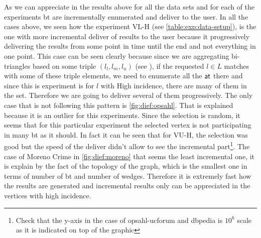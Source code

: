 As we can appreciate in the results above for all the data sets and for each of the experiments \acrshort{bt} are incrementally 
enumerated and deliver to the user. In all the cases above, we seen how the experiment VL-H (see \autoref{table:exp:data-setup}), 
is the one with more incremental deliver of results to the user because it progressively delivering the results from some point in 
time until the end and not everything in one point. This case can be seen clearly because since we are aggregating bi-triangles based on 
some triple $(l_l,l_m,l_u)$ (see ), if the requested $l \in L$ matches with some of these triple elements, 
we need to enumerate all the $\mathsf{at}$ there and since this is experiment is for $l$ with High incidence, there are many of them in the set.
Therefore we are going to deliver several of them progressively.
The only case that is not following this pattern is \autoref{fig:dief:opsahl}. That is explained because it is an outlier for this experiments.
Since the selection is random, it seems that for this particular experiment the selected vertex is not participating in many \acrshort{bt} as it should.
In fact it can be seen that for VU-H, the selection was good but the speed of the deliver didn't allow to see the incremental part\footnote{Check that the y-axis in the case of opsahl-ucforum and \acrshort{dbpedia} is $10^6$ scale as it is indicated on top of the graphic}. 
The case of Moreno Crime in \autoref{fig:dief:moreno} that seems the least incremental one, it is explain by the fact of the topology of the graph, which is the smallest one 
in terms of number of \acrshort{bt} and number of wedges. Therefore it is extremely fast how the results are generated and incremental results only can be appreciated in the vertices with high incidence.

